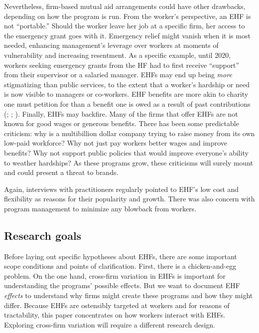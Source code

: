\documentclass[
  11pt,
  oneside]{article}
\begin{document}
Nevertheless, firm-based mutual aid arrangements could have other drawbacks, depending on how the program is run. From the worker's perspective, an EHF is not ``portable.'' Should the worker leave her job at a specific firm, her access to the emergency grant goes with it. Emergency relief might vanish when it is most needed, enhancing management's leverage over workers at moments of vulnerability and increasing resentment. As a specific example, until 2020, workers seeking emergency grants from the HF had to first receive ``support'' from their supervisor or a salaried manager. EHFs may end up being \emph{more} stigmatizing than public services, to the extent that a worker's hardship or need is now visible to managers or co-workers. EHF benefits are more akin to charity one must petition for than a benefit one is owed as a result of past contributions (; ; ). Finally, EHFs may backfire. Many of the firms that offer EHFs are not known for good wages or generous benefits. There has been some predictable criticism: why is a multibillion dollar company trying to raise money from its own low-paid workforce? Why not just pay workers better wages and improve benefits? Why not support public policies that would improve everyone's ability to weather hardships? As these programs grow, these criticisms will surely mount and could present a threat to brands.

Again, interviews with practitioners regularly pointed to EHF's low cost and flexibility as reasons for their popularity and growth. There was also concern with program management to minimize any blowback from workers.

\subsection{Research goals}\label{research-goals}

Before laying out specific hypotheses about EHFs, there are some important scope conditions and points of clarification. First, there is a chicken-and-egg problem. On the one hand, cross-firm variation in EHFs is important for understanding the programs' possible effects. But we want to document EHF \emph{effects} to understand why firms might create these programs and how they might differ. Because EHFs are ostensibly targeted at workers and for reasons of tractability, this paper concentrates on how workers interact with EHFs. Exploring cross-firm variation will require a different research design.
\end{document}
